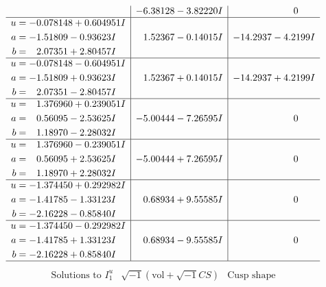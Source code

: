 \documentclass[1p]{elsarticle_modified}
\theoremstyle{definition}
\newcommand{\I}{\sqrt{-1}}
\begin{document}
$$\begin{array}{c|c|c}
 & -6.38128 - 3.82220 I & \phantom{-0.000000 } 0 \\ \hline\begin{aligned}
u &= -0.078148 + 0.604951 I \\
a &= -1.51809 - 0.93623 I \\
b &= \phantom{-}2.07351 + 2.80457 I\end{aligned}
 & \phantom{-}1.52367 - 0.14015 I & -14.2937 - 4.2199 I \\ \hline\begin{aligned}
u &= -0.078148 - 0.604951 I \\
a &= -1.51809 + 0.93623 I \\
b &= \phantom{-}2.07351 - 2.80457 I\end{aligned}
 & \phantom{-}1.52367 + 0.14015 I & -14.2937 + 4.2199 I \\ \hline\begin{aligned}
u &= \phantom{-}1.376960 + 0.239051 I \\
a &= \phantom{-}0.56095 - 2.53625 I \\
b &= \phantom{-}1.18970 - 2.28032 I\end{aligned}
 & -5.00444 - 7.26595 I & \phantom{-0.000000 } 0 \\ \hline\begin{aligned}
u &= \phantom{-}1.376960 - 0.239051 I \\
a &= \phantom{-}0.56095 + 2.53625 I \\
b &= \phantom{-}1.18970 + 2.28032 I\end{aligned}
 & -5.00444 + 7.26595 I & \phantom{-0.000000 } 0 \\ \hline\begin{aligned}
u &= -1.374450 + 0.292982 I \\
a &= -1.41785 - 1.33123 I \\
b &= -2.16228 - 0.85840 I\end{aligned}
 & \phantom{-}0.68934 + 9.55585 I & \phantom{-0.000000 } 0 \\ \hline\begin{aligned}
u &= -1.374450 - 0.292982 I \\
a &= -1.41785 + 1.33123 I \\
b &= -2.16228 + 0.85840 I\end{aligned}
 & \phantom{-}0.68934 - 9.55585 I & \phantom{-0.000000 } 0\\
 \hline 
 \end{array}$$\newpage$$\begin{array}{c|c|c}  
\text{Solutions to }I^u_{1}& \I (\text{vol} + \sqrt{-1}CS) & \text{Cusp shape}\\

\end{array}$$
\end{document}
